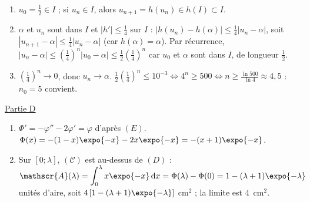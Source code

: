 \begin{corrige}
\begin{enumerate}
\begin{enumerate}
      \item $u_0 = \frac{1}{2} \in I$ ; si $u_n \in I$, alors $u_{n+1} = h(u_n) \in h(I) \subset I$.
      \item $\alpha$ et $u_n$ sont dans $I$ et $|h'| \leq \frac{1}{4}$ sur $I$ : $|h(u_n) - h(\alpha)| \leq \frac{1}{4}|u_n - \alpha|$, soit
            $|u_{n+1} - \alpha| \leq \frac{1}{4}|u_n - \alpha|$ (car $h(\alpha) = \alpha$). Par r\'ecurrence,
            $|u_n - \alpha| \leq \left(\frac{1}{4}\right)^n|u_0 - \alpha| \leq \frac{1}{2}\left(\frac{1}{4}\right)^n$ car $u_0$ et $\alpha$ sont dans $I$,
            de longueur $\frac{1}{2}$.
      \item $\left(\frac{1}{4}\right)^n \to 0$, donc $u_n \to \alpha$. $\frac{1}{2}\left(\frac{1}{4}\right)^n \leq 10^{-3} \iff 4^n \geq 500 \iff
            n \geq \frac{\ln 500}{\ln 4} \approx 4{,}5$ : $n_0 = 5$ convient.
      \end{enumerate}
\end{enumerate}
\underline{Partie D}
\begin{enumerate}
\item $\Phi' = -\varphi'' - 2\varphi' = \varphi$ d'apr\`es $(E)$. $\Phi(x) = -(1 - x)\expo{-x} - 2x\expo{-x} = -(x + 1)\expo{-x}$.
\item Sur $[0 ; \lambda]$, $(\mathscr{C})$ est au-dessus de $(D)$ : $\mathscr{A}(\lambda) = \displaystyle\int_0^\lambda x\expo{-x}\,\mathrm{d}x = \Phi(\lambda) - \Phi(0)
      = 1 - (\lambda + 1)\expo{-\lambda}$ unit\'es d'aire, soit $4\left[1 - (\lambda + 1)\expo{-\lambda}\right]$ cm$^2$ ; la limite est $4$~cm$^2$.
\end{enumerate}


\end{corrige}
